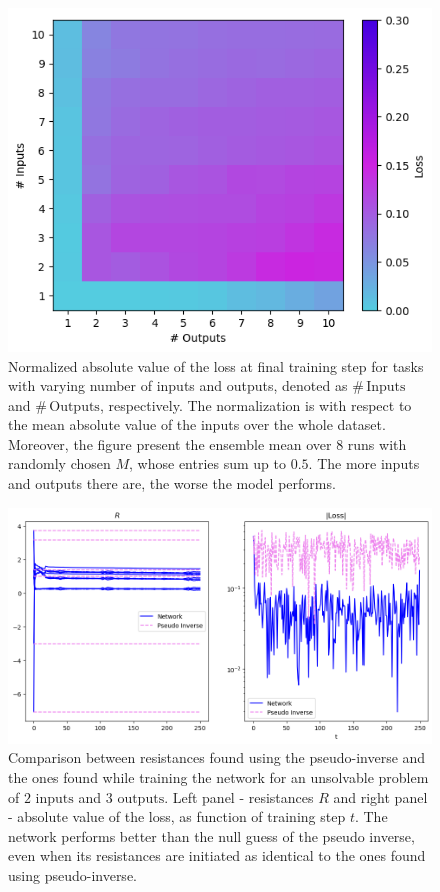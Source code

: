 \documentclass[%
 reprint,
 amsmath,amssymb,
 aps,
]{revtex4-2}
\begin{document}
{    \begin{figure}[ht]
    \centerline{
    \includegraphics[width=\columnwidth]{Figures/loss_afo_in_out.png}
    }
    \caption{Normalized absolute value of the loss at final training step for tasks with varying number of inputs and outputs, denoted as $\# \, \text{Inputs}$ and $\# \, \text{Outputs}$, respectively. The normalization is with respect to the mean absolute value of the inputs over the whole dataset. Moreover, the figure present the ensemble mean over $8$ runs with randomly chosen $M$, whose entries sum up to $0.5$. The more inputs and outputs there are, the worse the model performs.}
    \label{fig:log_loss_afo_inputs_outputs}
    \end{figure}

    \begin{figure}[ht]
    \centerline{
    \includegraphics[width=\columnwidth]{Figures/pseudo_vs_network_comparison.png}
    }
    \caption{Comparison between resistances found using the pseudo-inverse and the ones found while training the network for an unsolvable problem of $2\text{ inputs}$ and $3\text{ outputs}$. Left panel - resistances $R$ and right panel - absolute value of the loss, as function of training step $t$. The network performs better than the null guess of the pseudo inverse, even when its resistances are initiated as identical to the ones found using pseudo-inverse.}
    \label{fig:pseudo_vs_network_comparison}
    \end{figure}

}
\end{document}
